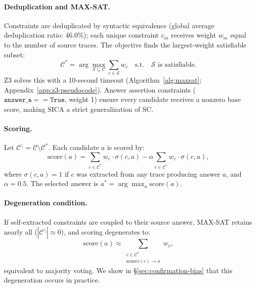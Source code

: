 \paragraph{Deduplication and MAX-SAT.} Constraints are deduplicated by syntactic equivalence (global average deduplication ratio: 46.0\%); each unique constraint $c_m$ receives weight $w_m$ equal to the number of source traces. The objective finds the largest-weight satisfiable subset:
\begin{equation}
\label{eq:maxsat}
\mathcal{C}^* = \arg\max_{\mathcal{S} \subseteq \mathcal{C}} \sum_{c \in \mathcal{S}} w_c \quad \text{s.t.} \quad \mathcal{S} \text{ is satisfiable.}
\end{equation}
Z3 \citep{demoura2008z3} solves this with a 10-second timeout (Algorithm~\ref{alg:maxsat}; Appendix~\ref{app:z3-pseudocode}). Answer assertion constraints ($\texttt{answer\_a} == \texttt{True}$, weight 1) ensure every candidate receives a nonzero base score, making SICA a strict generalization of SC.

\paragraph{Scoring.} Let $\mathcal{C}^{\setminus} = \mathcal{C} \setminus \mathcal{C}^*$. Each candidate $a$ is scored by:
\begin{equation}
\label{eq:score}
\text{score}(a) = \sum_{c \in \mathcal{C}^*} w_c \cdot \sigma(c, a) - \alpha \sum_{c \in \mathcal{C}^{\setminus}} w_c \cdot \sigma(c, a),
\end{equation}
where $\sigma(c, a) = 1$ if $c$ was extracted from any trace producing answer $a$, and $\alpha = 0.5$. The selected answer is $a^* = \arg\max_{a} \text{score}(a)$.

\paragraph{Degeneration condition.} If self-extracted constraints are coupled to their source answer, MAX-SAT retains nearly all ($|\mathcal{C}^{\setminus}| \approx 0$), and scoring degenerates to:
\begin{equation}
\label{eq:degenerate}
\text{score}(a) \approx \sum_{\substack{c \in \mathcal{C}^* \\ \text{source}(c) \to a}} w_c,
\end{equation}
equivalent to majority voting. We show in \S\ref{sec:confirmation-bias} that this degeneration occurs in practice.

